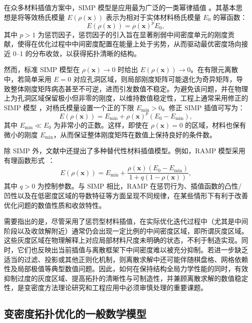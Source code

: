 在众多材料插值方案中，SIMP 模型是应用最为广泛的一类幂律插值 \cite{bendsoeOptimalShapeDesign1989a}。其基本思想是将等效杨氏模量 $E(\rho(\boldsymbol{x}))$ 表示为相对于实体材料杨氏模量 $E_0$ 的幂函数：
\begin{equation} \label{eq:ch6_standard_SIMP}
	E(\rho(\boldsymbol{x})) = \rho(\boldsymbol{x})^p E_0,
\end{equation}
其中 $p>1$ 为惩罚因子，惩罚因子的引入旨在显著削弱中间密度单元的刚度贡献，使得在优化过程中中间密度配置在能量上处于劣势，从而驱动最优密度场向接近 0–1 的分布收敛，以获得拓扑清晰的结构。

然而，标准 SIMP 模型在 $\rho(\boldsymbol{x})\to0$ 时给出 $E(\rho(\boldsymbol{x}))\to0$。在有限元离散中，若简单采用 $E=0$ 对应孔洞区域，则局部刚度矩阵可能退化为奇异矩阵，导致整体刚度矩阵病态甚至不可逆，进而引发数值不稳定。为避免该问题，并在物理上为孔洞区域保留极小但非零的刚度，以维持数值稳定性，工程上通常采用修正的 SIMP 模型 \cite{zhouCOCAlgorithmPart1991}，对杨氏模量设置一个正的下限 $E_{\min}>0$。修正 SIMP 插值可写为：
\begin{equation} \label{eq:ch6_modified_SIMP}
	E(\rho(\boldsymbol{x})) = E_{\min} + \rho(\boldsymbol{x})^p(E_0-E_{\min}),
\end{equation}
其中 $E_{\min}\ll{E}_0$ 为非常小的正数。这样，即使在 $\rho(\boldsymbol{x})=0$ 的区域，材料也保有微小的刚度 $E_{\min}$，从而保证整体刚度矩阵在数值上保持良好的条件数。

除 SIMP 外，文献中还提出了多种替代性材料插值模型。例如，RAMP 模型采用有理函数形式~\cite{stolpeAlternativeInterpolationScheme2001a}：
\[
E(\rho(\boldsymbol{x})) = E_{\min} + \frac{\rho(\boldsymbol{x})(E_0-E_{\min})}{1+q(1-\rho(\boldsymbol{x}))},
\]
其中 $q>0$ 为控制参数。与 SIMP 相比，RAMP 在惩罚行为、插值函数的凸性/凹性以及在低密度区域的导数特征等方面呈现不同规律，在某些情形下有利于改善优化问题的数值性质和收敛特性。

需要指出的是，尽管采用了惩罚型材料插值，在实际优化迭代过程中（尤其是中间阶段以及收敛解附近）通常仍会出现一定比例的中间密度区域，即所谓灰度区域。这些灰度区域在物理解释上对应局部材料尺度未明确的状态，不利于制造实现。同时，它们也反映出当前插值与离散框架下中间密度难以被充分抑制。若进一步缺乏适当的过滤、投影或其他正则化机制，则离散求解中还可能伴随棋盘格、网格依赖性及局部极值等典型数值问题。因此，如何在保持结构全局力学性能的同时，有效抑制过度的灰度区域、提高拓扑的清晰性与可制造性，并兼顾离散求解的数值稳定性，是变密度方法理论研究和工程应用中必须审慎处理的重要课题。


\subsection{变密度拓扑优化的一般数学模型}
\label{subsec:general_formulation}

